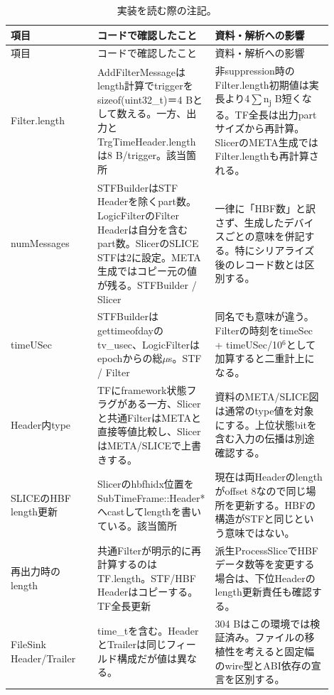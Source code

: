 \FloatBarrier
{\footnotesize\setlength{\tabcolsep}{3pt}\begin{longtable}{p{0.3\linewidth}p{0.12\linewidth}p{0.48\linewidth}}
\caption{実装を読む際の注記。}\label{tab:format-html-16}\\
\hline
項目 & コードで確認したこと & 資料・解析への影響 \\ \hline\endfirsthead
\hline 項目 & コードで確認したこと & 資料・解析への影響 \\ \hline\endhead
{Filter.length} & {AddFilterMessageはlength計算でtriggerをsizeof(uint32\_t)＝4 Bとして数える。一方、出力とTrgTimeHeader.lengthは8 B/trigger。該当箇所} & {非suppression時のFilter.length初期値は実長より4$\sum$n\textsubscript{j} B短くなる。TF全長は出力partサイズから再計算。SlicerのMETA生成ではFilter.lengthも再計算される。} \\
{numMessages} & {STFBuilderはSTF Headerを除くpart数。LogicFilterのFilter Headerは自分を含むpart数。SlicerのSLICE STFは2に設定。META生成ではコピー元の値が残る。STFBuilder / Slicer} & {一律に「HBF数」と訳さず、生成したデバイスごとの意味を併記する。特にシリアライズ後のレコード数とは区別する。} \\
{timeUSec} & {STFBuilderはgettimeofdayのtv\_usec、LogicFilterはepochからの総$\mu$s。STF / Filter} & {同名でも意味が違う。Filterの時刻をtimeSec + timeUSec/10$^6$として加算すると二重計上になる。} \\
{Header内type} & {TFにframework状態フラグがある一方、Slicerと共通FilterはMETAと直接等値比較し、SlicerはMETA/SLICEで上書きする。} & {資料のMETA/SLICE図は通常のtype値を対象にする。上位状態bitを含む入力の伝播は別途確認する。} \\
{SLICEのHBF length更新} & {Slicerのhbfhidx位置をSubTimeFrame::Header*へcastしてlengthを書いている。該当箇所} & {現在は両Headerのlengthがoffset 8なので同じ場所を更新する。HBFの構造がSTFと同じという意味ではない。} \\
{再出力時のlength} & {共通Filterが明示的に再計算するのはTF.length。STF/HBF Headerはコピーする。TF全長更新} & {派生ProcessSliceでHBFデータ数等を変更する場合は、下位Headerのlength更新責任も確認する。} \\
{FileSink Header/Trailer} & {time\_tを含む。HeaderとTrailerは同じフィールド構成だが値は異なる。} & {304 Bはこの環境では検証済み。ファイルの移植性を考えると固定幅のwire型とABI依存の宣言を区別する。} \\
\hline\end{longtable}}

\FloatBarrier
